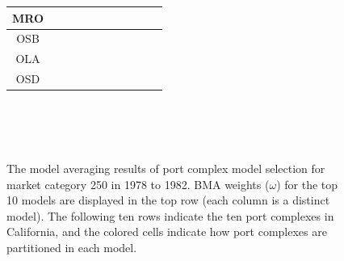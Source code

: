 \documentclass[12pt]{article}
\begin{document}
\begin{landscape}
\begin{figure}[!h]
{\begin{tabular}{|c|c|c|c|c|c|c|c|c|c|c|}
        MRO&\cellcolor[HTML]{984EA3}&\cellcolor[HTML]{984EA3}&\cellcolor[HTML]{984EA3}&\cellcolor[HTML]{984EA3}&\cellcolor[HTML]{984EA3}&\cellcolor[HTML]{984EA3}&\cellcolor[HTML]{984EA3}&\cellcolor[HTML]{FF7F00}&\cellcolor[HTML]{984EA3}&\cellcolor[HTML]{984EA3} \\ \hline%
        OSB&\cellcolor[HTML]{FF7F00}&\cellcolor[HTML]{FF7F00}&\cellcolor[HTML]{FF7F00}&\cellcolor[HTML]{FF7F00}&\cellcolor[HTML]{FF7F00}&\cellcolor[HTML]{FF7F00}&\cellcolor[HTML]{FF7F00}&\cellcolor[HTML]{FF7F00}&\cellcolor[HTML]{984EA3}&\cellcolor[HTML]{FF7F00} \\ \hline%
        OLA&\cellcolor[HTML]{FF7F00}&\cellcolor[HTML]{FFFF33}&\cellcolor[HTML]{FF7F00}&\cellcolor[HTML]{FFFF33}&\cellcolor[HTML]{FF7F00}&\cellcolor[HTML]{FFFF33}&\cellcolor[HTML]{FFFF33}&\cellcolor[HTML]{FFFF33}&\cellcolor[HTML]{FF7F00}&\cellcolor[HTML]{FF7F00} \\ \hline%
        OSD&\cellcolor[HTML]{FF7F00}&\cellcolor[HTML]{FFFF33}&\cellcolor[HTML]{FFFF33}&\cellcolor[HTML]{A65628}&\cellcolor[HTML]{FFFF33}&\cellcolor[HTML]{FFFF33}&\cellcolor[HTML]{A65628}&\cellcolor[HTML]{FFFF33}&\cellcolor[HTML]{FFFF33}&\cellcolor[HTML]{FF7F00} \\ \hline%
\end{tabular}}
$~$\\$~$\\$~$\\
\caption{The model averaging results of port complex model selection for 
market category 250 in 1978 to 1982. BMA weights (\(\omega\)) for the top 10 
models are displayed in the top row (each column is a distinct model). The 
following ten rows indicate the ten port complexes in California, and the 
colored cells indicate how port complexes are partitioned in each model.}
\label{colorTab78}
\end{figure}
\end{landscape}

%
\clearpage
%
\end{document}
